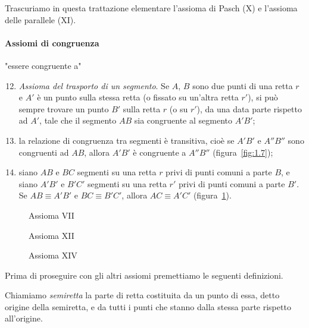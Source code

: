 {\osservazione Trascuriamo in questa trattazione elementare l'assioma di Pasch (X) e l'assioma delle parallele (XI).

\paragraph{Assiomi di congruenza} "essere congruente a"
\begin{enumerate}[label=\Roman{*}.]
\setcounter{enumi}{11}
\item \emph{Assioma del trasporto di un segmento}. Se $ A $, $ B $ sono due punti di una retta $ r $ e $ A' $ è un punto sulla stessa retta (o fissato su un'altra retta $ r' $), si può sempre trovare un punto $ B' $ sulla retta $ r $ (o su $ r' $), da una data parte rispetto ad $ A' $, tale che il segmento $ AB $ sia congruente al segmento $ A'B' $;
\item la relazione di congruenza tra segmenti è transitiva, cioè se $ A'B' $ e $ A''B'' $ sono congruenti ad $ AB $, allora $ A'B' $ è congruente a $ A''B'' $ (figura~\ref{fig:1.7});
\item siano $ AB $ e $ BC $ segmenti su una retta $ r $ privi di punti comuni a parte $ B $, e siano $ A'B' $ e $ B'C' $ segmenti su una retta $ r' $ privi di punti comuni a parte $ B' $. Se $AB\equiv A'B'$ e $BC\equiv B'C'$, allora  $AC\equiv A'C'$ (figura~\ref{fig:1.8}).
\end{enumerate}

\begin{figure}[b,t,h]
 \begin{minipage}[b]{.28\textwidth}
 \centering
 
 \caption{Assioma VII}\label{fig:1.6}
 \end{minipage}
 \begin{minipage}[b]{.34\textwidth}
 \centering
 
 \caption{Assioma XII}\label{fig:1.7}
 \end{minipage}
 \begin{minipage}[b]{.34\textwidth}
 \centering
 
 \caption{Assioma XIV}\label{fig:1.8}
 \end{minipage}
\end{figure}

Prima di proseguire con gli altri assiomi premettiamo le seguenti definizioni.
\begin{definizione}
Chiamiamo \emph{semiretta} la parte di retta costituita da un punto di essa, detto origine della semiretta, e da tutti i punti che stanno dalla stessa parte rispetto all'origine.
\end{definizione}

}
